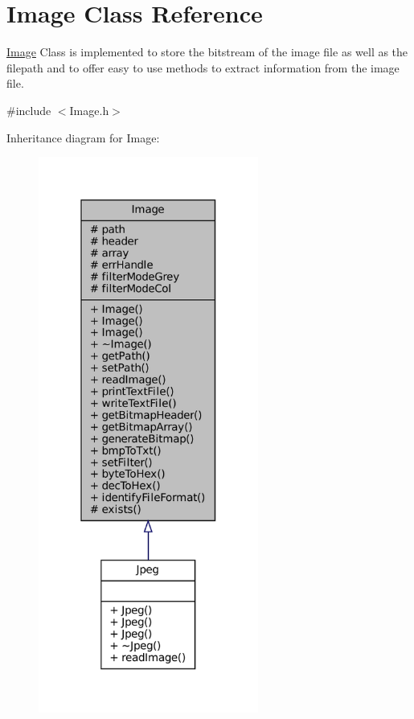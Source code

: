 \hypertarget{classImage}{}\section{Image Class Reference}
\label{classImage}


\mbox{\hyperlink{classImage}{Image}} Class is implemented to store the bitstream of the image file as well as the filepath and to offer easy to use methods to extract information from the image file.  




{\ttfamily \#include $<$Image.\+h$>$}



Inheritance diagram for Image\+:\nopagebreak
\begin{figure}[H]
\begin{center}
\leavevmode
\includegraphics[width=205pt]{classImage__inherit__graph}
\end{center}
\end{figure}


